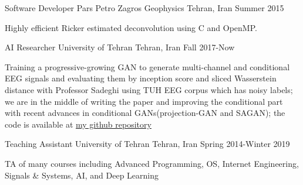 \begin{cventries}
  \cventry
    {Software Developer} %
    {Pars Petro Zagros Geophysics} %
    {Tehran, Iran} %
    {Summer 2015} %
    {
      \begin{cvitems} %
        \item {Highly efficient Ricker estimated deconvolution using C and OpenMP.}
      \end{cvitems}
    }


\end{cventries}



\begin{cventries}

 \cventry
    {AI Researcher} %
    {University of Tehran} %
    {Tehran, Iran} %
    {Fall 2017-Now} %
    {
      \begin{cvitems} %
      	\item {Training a progressive-growing GAN to generate multi-channel and conditional EEG signals and evaluating them by inception score and sliced Wasserstein distance with Professor Sadeghi using TUH EEG corpus which has noisy labels; we are in the middle of writing the paper and improving the conditional part with recent advances in conditional GANs(projection-GAN and SAGAN); the code is available at \href{https://github.com/Separius/EEG-GAN}{my github repository}}
      \end{cvitems}
    }

 \cventry
    {Teaching Assistant} %
    {University of Tehran} %
    {Tehran, Iran} %
    {Spring 2014-Winter 2019} %
    {
      \begin{cvitems} %
        \item {TA of many courses including Advanced Programming, OS, Internet Engineering, Signals \& Systems, AI, and Deep Learning}
      \end{cvitems}
    }
\end{cventries}
